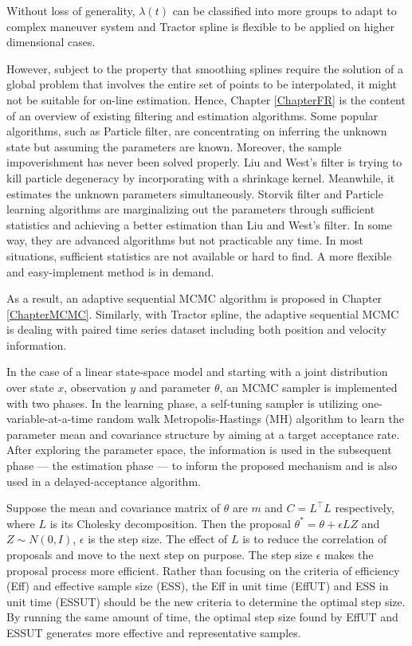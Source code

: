 Without loss of generality, $\lambda(t)$ can be classified into more groups to adapt to complex maneuver system and Tractor spline is flexible to be applied on higher dimensional cases. 

However, subject to the property that smoothing splines require the solution of a global problem that involves the entire set of points to be interpolated, it might not be suitable for on-line estimation. Hence, Chapter \ref{ChapterFR} is the content of an overview of existing filtering and estimation algorithms. Some popular algorithms, such as Particle filter, are concentrating on inferring the unknown state but assuming the parameters are known. Moreover, the sample impoverishment has never been solved properly. Liu and West's filter is trying to kill particle degeneracy by incorporating with a shrinkage kernel. Meanwhile, it estimates the unknown parameters simultaneously. Storvik filter and Particle learning algorithms are marginalizing out the parameters through sufficient statistics and achieving a better estimation than Liu and West's filter. In some way, they are advanced algorithms but not practicable any time. In most situations, sufficient statistics are not available or hard to find. A more flexible and easy-implement method is in demand. 
 
As a result, an adaptive sequential MCMC algorithm is proposed in Chapter \ref{ChapterMCMC}. Similarly, with Tractor spline, the adaptive sequential MCMC is dealing with paired time series dataset including both position and velocity information. 

In the case of a linear state-space model and starting with a joint distribution over state $x$, observation $y$ and parameter $\theta$, an MCMC sampler is implemented with two phases. In the learning phase, a self-tuning sampler is utilizing one-variable-at-a-time random walk Metropolis-Hastings (MH) algorithm to learn the parameter mean and covariance structure by aiming at a target acceptance rate. After exploring the parameter space, the information is used in the subsequent phase --- the estimation phase --- to inform the proposed mechanism and is also used in a delayed-acceptance algorithm. 

Suppose the mean and covariance matrix of $\theta$ are $m$ and $C=L^\top L$ respectively, where $L$ is its Cholesky decomposition. Then the proposal $\theta^*=\theta + \epsilon LZ$ and $Z\sim N(0,I)$, $\epsilon$ is the step size. The effect of $L$ is to reduce the correlation of proposals and move to the next step on purpose. The step size $\epsilon$ makes the proposal process more efficient. Rather than focusing on the criteria of efficiency (Eff) and effective sample size (ESS), the Eff in unit time (EffUT) and ESS in unit time (ESSUT) should be the new criteria to determine the optimal step size. By running the same amount of time, the optimal step size found by EffUT and ESSUT generates more effective and representative samples. 

